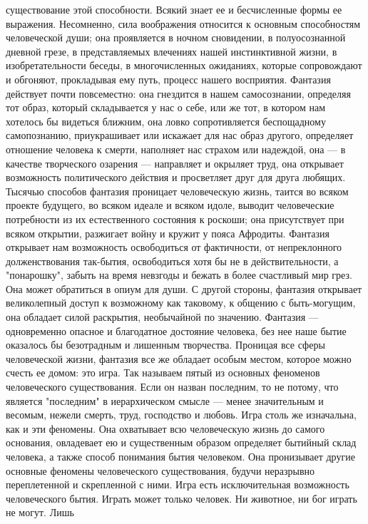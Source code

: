 \documentclass[12pt]{article}
\begin{document}
существование этой способности. Всякий знает ее и бесчисленные формы ее выражения. Несомненно, сила
воображения относится к основным способностям человеческой души; она проявляется в ночном сновидении, в
полуосознанной дневной грезе, в представляемых влечениях нашей инстинктивной жизни, в изобретательности
беседы, в многочисленных ожиданиях, которые сопровождают и обгоняют, прокладывая ему путь, процесс
нашего восприятия. Фантазия действует почти повсеместно: она гнездится в нашем самосознании, определяя
тот образ, который складывается у нас о себе, или же тот, в котором нам хотелось бы видеться ближним, она
ловко  сопротивляется  беспощадному  самопознанию,  приукрашивает  или  искажает  для  нас  образ  другого,
определяет отношение человека к смерти, наполняет нас страхом или надеждой, она --- в качестве творческого
озарения --- направляет и окрыляет труд, она открывает возможность политического действия и просветляет
друг  для  друга  любящих.  Тысячью  способов  фантазия  проницает  человеческую  жизнь,  таится  во  всяком
проекте будущего, во всяком идеале и всяком идоле, выводит человеческие потребности из их естественного
состояния к роскоши; она присутствует при всяком открытии, разжигает войну и кружит у пояса Афродиты.
Фантазия открывает нам возможность освободиться от фактичности, от непреклонного долженствования так-бытия, освободиться хотя бы не в действительности, а "понарошку", забыть на время невзгоды и бежать в более
счастливый  мир  грез.  Она  может  обратиться  в  опиум  для  души.  С  другой  стороны,  фантазия  открывает
великолепный доступ к возможному как таковому, к общению с быть-могущим, она обладает силой раскрытия,
необычайной по значению. Фантазия --- одновременно опасное и благодатное достояние человека, без нее наше
бытие оказалось бы безотрадным и лишенным творчества. Проницая все сферы человеческой жизни, фантазия
все же обладает особым местом, которое можно счесть ее домом: это игра.
Так называем пятый из основных феноменов человеческого существования. Если он назван последним, то не
потому, что является "последним" в иерархическом смысле --- менее значительным и весомым, нежели смерть,
труд, господство и любовь. Игра столь же изначальна, как и эти феномены. Она охватывает всю человеческую
жизнь до самого основания, овладевает ею и существенным образом определяет бытийный склад человека, а
также  способ  понимания  бытия  человеком.  Она  пронизывает  другие  основные  феномены  человеческого
существования,  будучи  неразрывно  переплетенной  и  скрепленной  с  ними.  Игра  есть  исключительная
возможность человеческого бытия. Играть может только человек. Ни животное, ни бог играть не могут. Лишь
\end{document}
